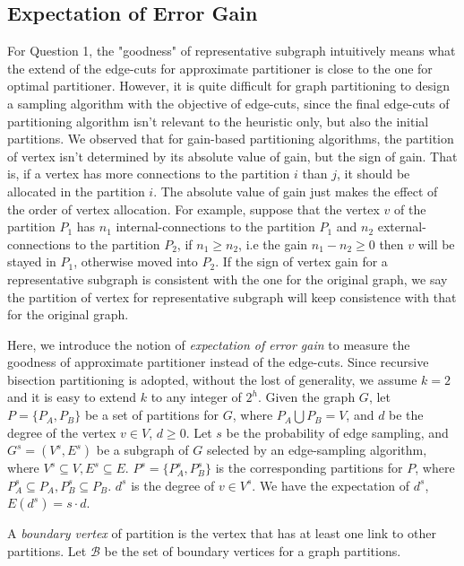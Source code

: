 \documentclass{sig-alternate-2013}
\begin{document}
\subsection{Expectation of Error Gain}
For Question 1, the "goodness" of representative subgraph intuitively means what the extend of the edge-cuts for approximate partitioner is close to the one for optimal partitioner. However, it is quite difficult for graph partitioning to design a sampling algorithm with the objective of edge-cuts, since the final edge-cuts of partitioning algorithm isn't relevant to the heuristic only, but also the initial partitions.
We observed that for gain-based partitioning algorithms, the partition of vertex isn't determined by its absolute value of gain, but the sign of gain. That is, if a vertex has more connections to the partition $i$ than $j$, it should be allocated in the partition $i$. The absolute value of gain just makes the effect of the order of vertex allocation.
For example, suppose that the vertex $v$ of the partition $P_1$ has $n_1$ internal-connections to the partition $P_1$ and $n_2$ external-connections to the partition $P_2$, if $n_1\geq n_2$, i.e the gain $n_1 - n_2 \geq 0$ then $v$ will be stayed in $P_1$, otherwise moved into $P_2$. If the sign of vertex gain for a representative subgraph is consistent with the one for the original graph, we say the partition of vertex for representative subgraph will keep consistence with that for the original graph.

Here, we introduce the notion of \textit{expectation of error gain} to measure the goodness of approximate partitioner instead of the edge-cuts.
Since recursive bisection partitioning is adopted, without the lost of generality, we assume $k = 2$ and it is easy to extend $k$ to any integer of $2^h$.
Given the graph $G$, let $P=\{P_A,P_B\}$ be a set of partitions for $G$, where $P_A \bigcup P_B = V$, and $d$ be the degree of the vertex $v \in V$, $d \geq 0$.
Let $s$ be the probability of edge sampling, and $G^s = (V^s, E^s)$ be a subgraph of $G$ selected by an edge-sampling algorithm, where $V^s \subseteq V, E^s \subseteq E$.
$P^s=\{P_A^s,P_B^s\}$ is the corresponding partitions for $P$, where $P_A^s \subseteq P_A, P_B^s \subseteq P_B$.
$d^s$ is the degree of $v \in V^s$. We have the expectation of $d^s$, $E(d^s) = s\cdot d$.

\begin{definition}\label{def-boundary}
 A \textit{boundary vertex} of partition is the vertex that has at least one link to other partitions. Let $\mathcal{B}$ be the set of boundary vertices for a graph partitions.
\end{definition}
\end{document}
